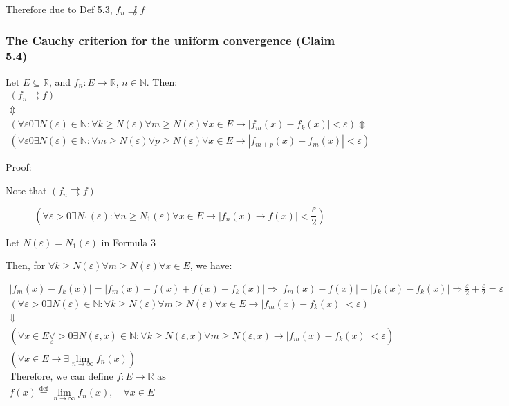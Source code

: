 Therefore due to Def 5.3, \(f_n \not\rightrightarrows f\)

\subsubsection{The Cauchy criterion for the uniform convergence (Claim 5.4)}

Let \(E \subseteq \mathbb{R}\), and \(f_n: E \rightarrow \mathbb{R}\), \(n \in \mathbb{N}\). Then:
\begin{gather*}
    \left( f_n \rightrightarrows f \right) \\
    \Updownarrow \\
    \left( \forall \varepsilon 0 \exists N \left( \varepsilon \right) \in \mathbb{N}: \forall k \geq N\left( \varepsilon \right) \forall m \geq N \left( \varepsilon \right) \forall x \in E \rightarrow \left| f_m\left( x \right) - f_k\left( x \right) \right| < \varepsilon \right)
    \Updownarrow \\
    \left( \forall \varepsilon 0 \exists N \left( \varepsilon \right) \in \mathbb{N}: \forall m \geq N\left( \varepsilon \right) \forall p \geq N \left( \varepsilon \right) \forall x \in E \rightarrow \left| f_{m + p}\left( x \right) - f_m\left( x \right) \right| < \varepsilon \right)
\end{gather*}

Proof:

Note that \(\left( f_n \rightrightarrows f \right)\)

\[
    \left( \forall \varepsilon > 0 \exists N_1(\varepsilon): \forall n \geq N_1(\varepsilon) \forall x \in E \rightarrow \left| f_n(x) \rightarrow f(x) \right| < \frac{\varepsilon}{2} \right)
\]

Let \(N(\varepsilon) = N_1(\varepsilon)\) in Formula 3

Then, for \(\forall k \geq N(\varepsilon) \forall m \geq N(\varepsilon) \forall x \in E \), we have:

\begin{gather*}
    \left| f_m(x) - f_k(x) \right| = \left| f_m(x) - f(x) + f(x) - f_k(x) \right| \Rightarrow \left| f_m(x) - f(x) \right| + \left| f_k(x) - f_k(x) \right| \Rightarrow \frac{\varepsilon}{2} + \frac{\varepsilon}{2} = \varepsilon\\
    \left(\forall \varepsilon>0 \exists N(\varepsilon) \in \mathbb{N}: \forall k \geqslant N(\varepsilon) \forall m \geqslant N(\varepsilon) \forall x \in E \rightarrow\left|f_m(x)-f_k(x)\right|<\varepsilon\right) \\
    \Downarrow \\
    \left(\forall x \in E \underset{\varepsilon}{\forall}>0 \exists N(\varepsilon, x) \in \mathbb{N}: \forall k \geqslant N(\varepsilon, x) \forall m \geqslant N(\varepsilon, x) \rightarrow\left|f_m(x)-f_k(x)\right|<\varepsilon\right) \\
    \left(\forall x \in E \rightarrow \exists \lim _{n \rightarrow \infty} f_n(x)\right) \\
    \text {Therefore, we can define } f: E \rightarrow \mathbb{R} \text { as } \\
    f(x) \stackrel{\operatorname{def}}{=} \lim _{n \rightarrow \infty} f_n(x), \quad \forall x \in E
\end{gather*}

